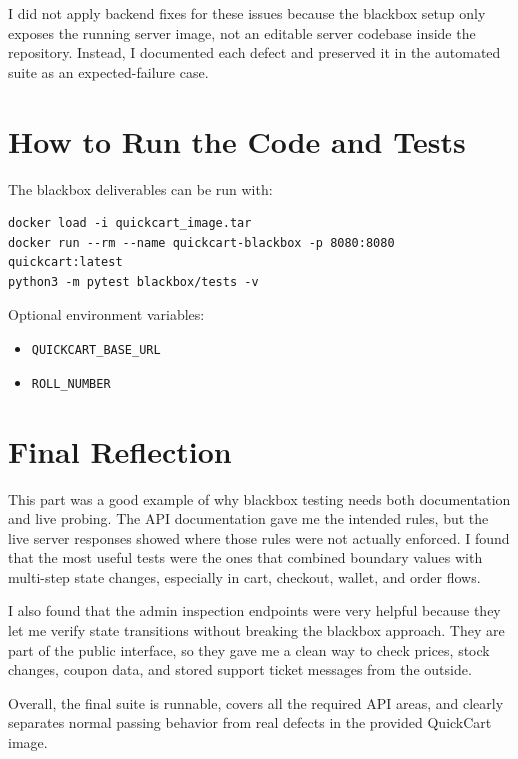 \documentclass[12pt]{article}
\begin{document}
I did not apply backend fixes for these issues because the blackbox setup only exposes the running server image, not an editable server codebase inside the repository. Instead, I documented each defect and preserved it in the automated suite as an expected-failure case.

\section{How to Run the Code and Tests}
The blackbox deliverables can be run with:

\begin{verbatim}
docker load -i quickcart_image.tar
docker run --rm --name quickcart-blackbox -p 8080:8080 quickcart:latest
python3 -m pytest blackbox/tests -v
\end{verbatim}

Optional environment variables:

\begin{itemize}
  \item \texttt{QUICKCART\_BASE\_URL}
  \item \texttt{ROLL\_NUMBER}
\end{itemize}

\section{Final Reflection}
This part was a good example of why blackbox testing needs both documentation and live probing. The API documentation gave me the intended rules, but the live server responses showed where those rules were not actually enforced. I found that the most useful tests were the ones that combined boundary values with multi-step state changes, especially in cart, checkout, wallet, and order flows.

I also found that the admin inspection endpoints were very helpful because they let me verify state transitions without breaking the blackbox approach. They are part of the public interface, so they gave me a clean way to check prices, stock changes, coupon data, and stored support ticket messages from the outside.

Overall, the final suite is runnable, covers all the required API areas, and clearly separates normal passing behavior from real defects in the provided QuickCart image.
\end{document}

